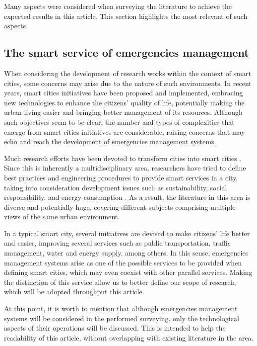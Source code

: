 \begin{refsection}
Many aspects were considered when surveying the literature to achieve the expected results in this article. This section highlights the most relevant of such aspects.

\subsection{The smart service of emergencies management}

When considering the development of research works within the context of smart cities, some concerns may arise due to the nature of such environments. In recent years, smart cities initiatives have been proposed and implemented, embracing new technologies to enhance the citizens' quality of life, potentially making the urban living easier and bringing better management of its resources. Although such objectives seem to be clear, the number and types of complexities that emerge from smart cities initiatives are considerable, raising concerns that may echo and reach the development of emergencies management systems.

Much research efforts have been devoted to transform cities into smart cities \cite{citiestransforming,smartstrategy}. Since this is inherently a multidisciplinary area, researchers have tried to define best practices and engineering procedures to provide smart services in a city, taking into consideration development issues such as sustainability, social responsibility, and energy consumption \cite{citiestransforming2}. As a result, the literature in this area is diverse and potentially huge, covering different subjects comprising multiple views of the same urban environment.

In a typical smart city, several initiatives are devised to make citizens' life better and easier, improving several services such as public transportation, traffic management, water and energy supply, among others. In this sense, emergencies management systems arise as one of the possible services to be provided when defining smart cities, which may even coexist with other parallel services. Making the distinction of this service allow us to better define our scope of research, which will be adopted throughput this article.

At this point, it is worth to mention that although emergencies management systems will be considered in the performed surveying, only the technological aspects of their operations will be discussed. This is intended to help the readability of this article, without overlapping with existing literature in the area.


\end{refsection}
